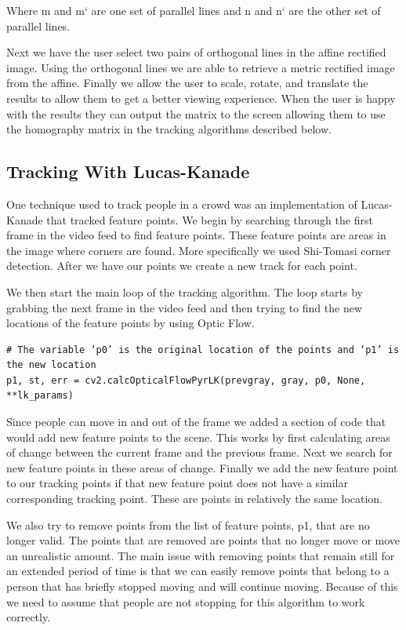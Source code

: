 \documentclass[conference]{IEEEtran}
\begin{document}
Where m and m` are one set of parallel lines and n  and n` are the other set of parallel lines.

Next we have the user select two pairs of orthogonal lines in the affine rectified image. Using the orthogonal lines we are able to retrieve a metric rectified image from the affine. Finally we allow the user to scale, rotate, and translate the results to allow them to get a better viewing experience. When the user is happy with the results they can output the matrix to the screen allowing them to use the homography matrix in the tracking algorithms described below.

\subsection{Tracking With Lucas-Kanade}

One technique used to track people in a crowd was an implementation of Lucas-Kanade that tracked feature points. We begin by searching through the first frame in the video feed to find feature points. These feature points are areas in the image where corners are found. More specifically we used Shi-Tomasi corner detection. After we have our points we create a new track for each point.

We then start the main loop of the tracking algorithm. The loop starts by grabbing the next frame in the video feed and then trying to find the new locations of the feature points by using Optic Flow.

\begin{lstlisting}
# The variable ‘p0’ is the original location of the points and ‘p1’ is the new location
p1, st, err = cv2.calcOpticalFlowPyrLK(prevgray, gray, p0, None, **lk_params)
\end{lstlisting}

Since people can move in and out of the frame we added a section of code that would add new feature points to the scene. This works by first calculating areas of change between the current frame and the previous frame. Next we search for new feature points in these areas of change. Finally we add the new feature point to our tracking points if that new feature point does not have a similar corresponding tracking point. These are points in relatively the same location.

We also try to remove points from the list of feature points, p1, that are no longer valid. The points that are removed are points that no longer move or move an unrealistic amount. The main issue with removing points that remain still for an extended period of time is that we can easily remove points that belong to a person that has briefly stopped moving and will continue moving. Because of this we need to assume that people are not stopping for this algorithm to work correctly.
\end{document}
